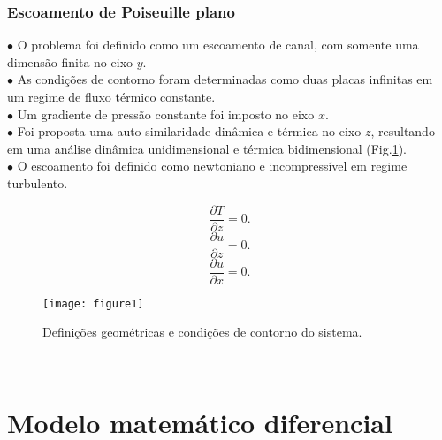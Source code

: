 \documentclass[xcolor=dvipsnames,10pt,aspectratio=169]{beamer}
\begin{document}
		\begin{frame}
			\frametitle{Escoamento de Poiseuille plano}
			$\bullet$ O problema foi definido como um escoamento de canal, com somente uma dimensão finita no eixo $y$. \\
			$\bullet$ As condições de contorno foram determinadas como duas placas infinitas em um regime de fluxo térmico constante.\\
			$\bullet$ Um gradiente de pressão constante foi imposto no eixo $x$.\\
			$\bullet$ Foi proposta uma auto similaridade dinâmica e térmica no eixo $z$, resultando em uma análise dinâmica unidimensional e térmica bidimensional (Fig.\ref{figure.1}). \\
			$\bullet$ O escoamento foi definido como newtoniano e incompressível em regime turbulento.\\
			\begin{minipage}[h!]{0.3\textwidth}
				\begin{equation*}
				 \frac{\partial T }{\partial z} = 0.
				\end{equation*}
				\begin{equation*}
				\frac{\partial u }{\partial z} = 0.
				\end{equation*}
				\begin{equation*}
				\frac{\partial u }{\partial x} = 0.
				\end{equation*}
			\end{minipage}
			\begin{minipage}[h!]{0.5\textwidth}
			\begin{figure}[h!]
				\centering
				\texttt{[image: figure1]}
				\caption{Definições geométricas e condições de contorno do sistema.}
				\label{figure.1}
			\end{figure}
			\end{minipage}
			\\
		\end{frame}
	
	

	
	\section{Modelo matemático diferencial}
	
	
	
	
		
\end{document}

